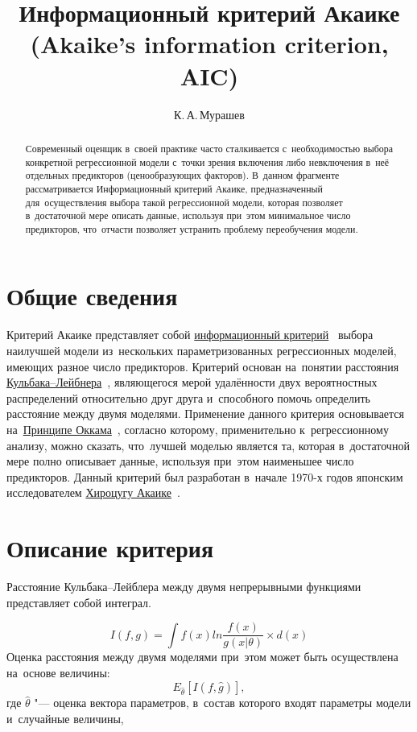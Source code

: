 \documentclass[]{scrartcl}
\title{Информационный критерий Акаике (\foreignlanguage{english}{Akaike's information criterion, AIC})}
\author{К.\,А.\,Мурашев}
\begin{document}
\maketitle

\begin{abstract}
Современный оценщик в~своей практике часто сталкивается с~необходимостью выбора конкретной регрессионной модели с~точки зрения включения либо невключения в~неё отдельных предикторов (ценообразующих факторов). В~данном фрагменте рассматривается Информационный критерий Акаике, предназначенный для~осуществления выбора такой регрессионной модели, которая позволяет в~достаточной мере описать данные, используя при~этом минимальное число предикторов, что~отчасти позволяет устранить проблему переобучения модели.
\end{abstract}

\section{Общие сведения}
Критерий Акаике представляет собой \href{https://ru.wikipedia.org/wiki/Информационный_критерий}{информационный критерий}~\cite{Wiki:IC} выбора наилучшей модели из~нескольких параметризованных регрессионных моделей, имеющих разное число предикторов. Критерий основан на~понятии расстояния \href{https://ru.wikipedia.org/wiki/Расстояние_Кульбака_—_Лейблера}{Кульбака--Лейбнера}~\cite{Wiki:Kullback-Leibler}, являющегося мерой удалённости двух вероятностных распределений относительно друг друга и~способного помочь определить расстояние между двумя моделями. Применение данного критерия основывается на~\href{http://www.machinelearning.ru/wiki/index.php?title=Бритва_Оккама}{Принципе Оккама}~\cite{MLRU:Okkama}, согласно которому, применительно к~регрессионному анализу, можно сказать, что~лучшей моделью является та, которая в~достаточной мере полно описывает данные, используя при~этом наименьшее число предикторов. Данный критерий был разработан в~начале 1970-х годов японским исследователем \href{https://ru.wikipedia.org/wiki/Акаикэ,_Хироцугу}{Хироцугу Акаике}~\cite{Wiki:Akaike-Xiroczugu}.

\section{Описание критерия}
Расстояние Кульбака--Лейблера между двумя непрерывными функциями представляет собой интеграл.

\begin{equation}\label{Kullback-Leibler-Dist}
I(f, g) = \int{f(x)ln}\frac{f(x)}{g(x|\theta)} \times d(x)
\end{equation}
Оценка расстояния между двумя моделями при~этом может быть осуществлена на~основе величины:
\begin{equation}\label{AIC-dist-between-two-models}
E_{\hat{\theta}}[I(f, \hat{g})],
\end{equation}
где $ \hat{\theta} $ "--- оценка вектора параметров, в~состав которого входят параметры модели и~случайные величины,
\end{document}
